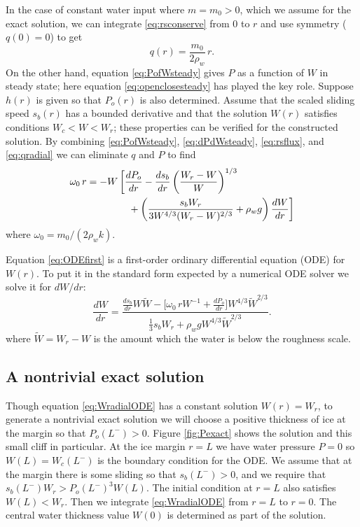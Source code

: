 \documentclass[gmd]{copernicus}   %
\begin{document}
In the case of constant water input where $m = m_0 > 0$, which we assume for the exact solution, we can integrate \eqref{eq:rsconserve} from $0$ to $r$ and use symmetry ($q(0)=0$) to get
\begin{equation}
q(r) = \frac{m_0}{2\rho_w} \, r. \label{eq:qradial}
\end{equation}
On the other hand, equation \eqref{eq:PofWsteady} gives $P$ as a function of $W$ in steady state; here equation \eqref{eq:openclosesteady} has played the key role.  Suppose $h(r)$ is given so that $P_o(r)$ is also determined.  Assume that the scaled sliding speed $s_b(r)$ has a bounded derivative and that the solution $W(r)$ satisfies conditions $W_c < W < W_r$; these properties can be verified for the constructed solution.  By combining \eqref{eq:PofWsteady}, \eqref{eq:dPdWsteady}, \eqref{eq:rsflux}, and \eqref{eq:qradial} we can eliminate $q$ and $P$ to find
\begin{align}
&\omega_0\, r = - W\, \bigg[\frac{dP_o}{dr} - \frac{ds_b}{dr} \left(\frac{W_r - W}{W}\right)^{1/3}  \label{eq:ODEfirst} \\
&\qquad \qquad \qquad + \left(\frac{s_b W_r}{3 W^{4/3} (W_r - W)^{2/3}} + \rho_w g\right) \frac{dW}{dr}\bigg] \notag
\end{align}
where $\omega_0 = m_0 / (2 \rho_w k)$.

Equation \eqref{eq:ODEfirst} is a first-order ordinary differential equation (ODE) for $W(r)$.  To put it in the standard form expected by a numerical ODE solver we solve it for $dW/dr$:
\begin{equation}
\frac{dW}{dr} = \frac{\frac{ds_b}{dr} W \tilde W - \Big[\omega_0\, r W^{-1} + \frac{dP_o}{dr}\Big] W^{4/3} \tilde W^{2/3}}{\frac{1}{3} s_b W_r + \rho_w g W^{4/3} \tilde W^{2/3}}.
\label{eq:WradialODE}
\end{equation}
where $\tilde W = W_r - W$ is the amount which the water is below the roughness scale.

\subsection{A nontrivial exact solution}  \label{subsect:exactsoln}  Though equation \eqref{eq:WradialODE} has a constant solution $W(r)=W_r$, to generate a nontrivial exact solution we will choose a positive thickness of ice at the margin so that $P_o(L^-)>0$.  Figure \ref{fig:Pexact} shows the solution and this small cliff in particular.  At the ice margin $r=L$ we have water pressure $P=0$ so $W(L)=W_c(L^-)$ is the boundary condition for the ODE.  We assume that at the margin there is some sliding so that $s_b(L^-)>0$, and we require that $s_b(L^-) W_r > P_o(L^-)^3 W(L)$.  The initial condition at $r=L$ also satisfies $W(L) < W_r$.  Then we integrate \eqref{eq:WradialODE} from $r=L$ to $r=0$.  The central water thickness value $W(0)$ is determined as part of the solution.
\end{document}
